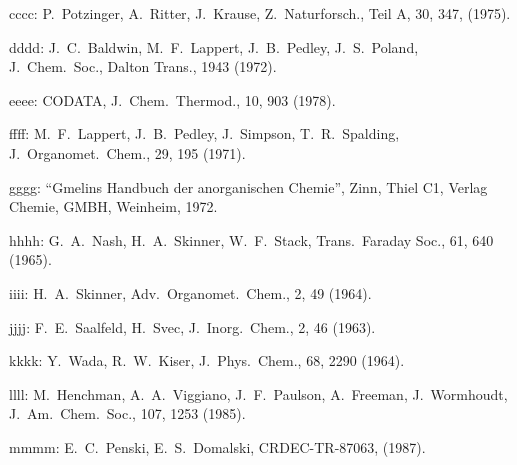 \begin{description}
\item{cccc: } P.\ Potzinger, A.\ Ritter, J.\ Krause, Z.\ Naturforsch., Teil A, 30, 347,
       (1975).
  
\item{dddd: } J.\ C.\ Baldwin, M.\ F.\ Lappert, J.\ B.\ Pedley, J.\ S.\ Poland,
       J.\ Chem.\ Soc., Dalton Trans., 1943 (1972).
  
\item{eeee: } CODATA, J.\ Chem.\ Thermod., 10, 903 (1978).
  
\item{ffff: } M.\ F.\ Lappert, J.\ B.\ Pedley, J.\ Simpson, T.\ R.\ Spalding, J.\ Organomet.\
       Chem., 29, 195 (1971).
  
\item{gggg: } ``Gmelins Handbuch der anorganischen Chemie'', Zinn, Thiel C1,
       Verlag Chemie, GMBH, Weinheim, 1972.
  
\item{hhhh: } G.\ A.\ Nash, H.\ A.\ Skinner, W.\ F.\ Stack, Trans.\ Faraday Soc.,
      61, 640 (1965).
  
\item{iiii: } H.\ A.\ Skinner, Adv.\ Organomet.\ Chem., 2, 49 (1964).
  
\item{jjjj: } F.\ E.\ Saalfeld, H.\ Svec, J.\ Inorg.\ Chem., 2, 46 (1963).
  
\item{kkkk: } Y.\ Wada, R.\ W.\ Kiser, J.\ Phys.\ Chem., 68, 2290 (1964).
  
\item{llll: } M.\ Henchman, A.\ A.\ Viggiano, J.\ F.\ Paulson, A.\ Freeman, J.\ Wormhoudt,
       J.\ Am.\ Chem.\ Soc., 107, 1253 (1985).
  
\item{mmmm: } E.\ C.\ Penski, E.\ S.\ Domalski, CRDEC-TR-87063, (1987).
\end{description}
